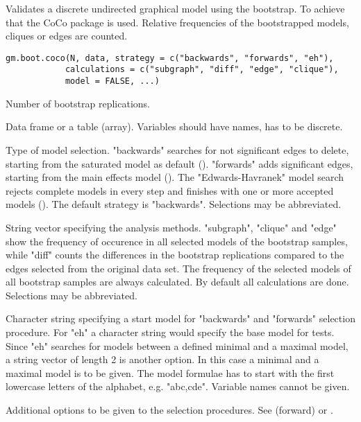\begin{Description}\relax
Validates a discrete undirected graphical model using the bootstrap.
To achieve that the CoCo package is used.
Relative frequencies of the bootstrapped models, cliques or edges are counted.
\end{Description}
\begin{Usage}
\begin{verbatim}
gm.boot.coco(N, data, strategy = c("backwards", "forwards", "eh"),
            calculations = c("subgraph", "diff", "edge", "clique"),
            model = FALSE, ...)
\end{verbatim}
\end{Usage}
\begin{Arguments}
\begin{ldescription}
\item[\code{N}] Number of bootstrap replications. 
\item[\code{data}] Data frame or a table (array). Variables should have names,  has to be discrete. 
\item[\code{strategy}] Type of model selection. "backwards" searches for not significant edges to delete, starting from the saturated model as default ().
"forwards" adds significant edges, starting from the main effects model (). The "Edwards-Havranek"
model search rejects complete models in every step and finishes with one or more accepted models ().
The default strategy is "backwards". Selections may be abbreviated.

\item[\code{calculations}] String vector specifying the analysis methods. "subgraph", "clique" and "edge" show the frequency of occurence 
in all selected models of the bootstrap samples, while "diff" counts the differences
in the bootstrap replications compared to the edges selected from the original data set.
The frequency of the selected models of all bootstrap samples are always calculated. By default all calculations are done.
Selections may be abbreviated.

\item[\code{model}] Character string specifying a start model for "backwards" and "forwards" selection procedure.
For "eh" a character string would specify the base model for tests.
Since "eh" searches for models between a defined minimal and a maximal model, a string vector of length 2 is another option.
In this case a minimal and a maximal model is to be given.
The model formulae has to start with the first lowercase letters of the alphabet, e.g. "abc,cde". Variable names cannot be given.

\item[\code{...}] Additional options to be given to the selection procedures. See  (forward) or . 
\end{ldescription}
\end{Arguments}
